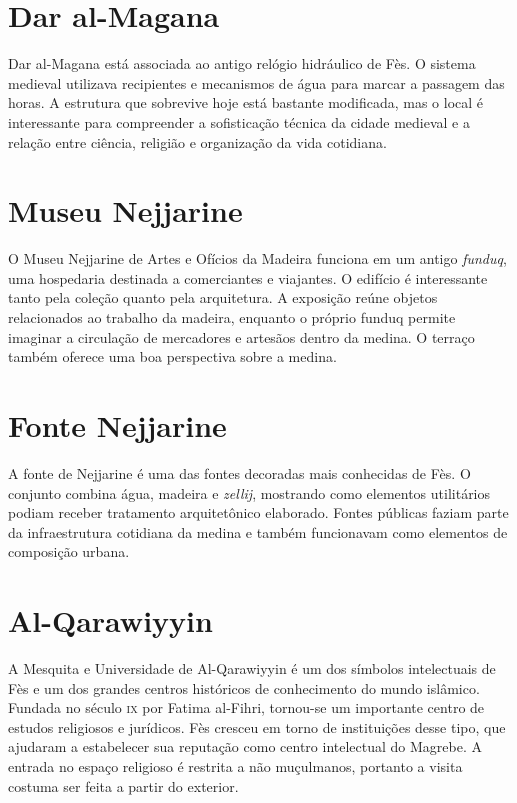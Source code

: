 \chapter{Dar al-Magana}

Dar al-Magana está associada ao antigo relógio hidráulico de Fès. O sistema medieval utilizava recipientes e mecanismos de água para marcar a passagem das horas. A estrutura que sobrevive hoje está bastante modificada, mas o local é interessante para compreender a sofisticação técnica da cidade medieval e a relação entre ciência, religião e organização da vida cotidiana.

\chapter{Museu Nejjarine}

O Museu Nejjarine de Artes e Ofícios da Madeira funciona em um antigo \textit{funduq}, uma hospedaria destinada a comerciantes e viajantes. O edifício é interessante tanto pela coleção quanto pela arquitetura. A exposição reúne objetos relacionados ao trabalho da madeira, enquanto o próprio funduq permite imaginar a circulação de mercadores e artesãos dentro da medina. O terraço também oferece uma boa perspectiva sobre a medina.

\chapter{Fonte Nejjarine}

A fonte de Nejjarine é uma das fontes decoradas mais conhecidas de Fès. O conjunto combina água, madeira e \textit{zellij}, mostrando como elementos utilitários podiam receber tratamento arquitetônico elaborado. Fontes públicas faziam parte da infraestrutura cotidiana da medina e também funcionavam como elementos de composição urbana.

\chapter{Al-Qarawiyyin}

A Mesquita e Universidade de Al-Qarawiyyin é um dos símbolos intelectuais de Fès e um dos grandes centros históricos de conhecimento do mundo islâmico. Fundada no século \textsc{ix} por Fatima al-Fihri, tornou-se um importante centro de estudos religiosos e jurídicos. Fès cresceu em torno de instituições desse tipo, que ajudaram a estabelecer sua reputação como centro intelectual do Magrebe. A entrada no espaço religioso é restrita a não muçulmanos, portanto a visita costuma ser feita a partir do exterior.

